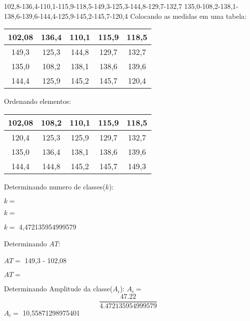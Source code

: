 \documentclass[12pt]{article}%
\begin{document}
 102,8-136,4-110,1-115,9-118,5-149,3-125,3-144,8-129,7-132,7
 135,0-108,2-138,1-138,6-139,6-144,4-125,9-145,2-145,7-120,4
 \break Colocando as medidas em uma tabela:
\begin{center}
    \begin{tabular}{|c|c|c|c|c|}
    \hline
        102,08 & 136,4 & 110,1 & 115,9 & 118,5 \\\hline
        149,3 & 125,3 & 144,8 & 129,7 & 132,7 \\\hline
        135,0 & 108,2 & 138,1 & 138,6 & 139,6 \\\hline
        144,4 & 125,9 & 145,2 & 145,7 & 120,4 \\\hline 
    \end{tabular}
\end{center}
Ordenando elementos:
\begin{center}
    \begin{tabular}{|c|c|c|c|c|}
    \hline
        102,08 & 108,2 & 110,1 & 115,9 & 118,5 \\\hline
        120,4 & 125,3 & 125,9 & 129,7 & 132,7 \\\hline
        135,0 & 136,4 & 138,1 & 138,6 & 139,6 \\\hline
        144,4 & 144,8 & 145,2 & 145,7 & 149,3 \\\hline 
    \end{tabular}
\end{center}
 Determinando numero de classes($k$):
 
 $k=$ 
 
 $k=$ 

 $k=$ 4,472135954999579


Determinando $AT$:
 
$AT=$ 149,3 - 102,08

$AT=$ \pgfmathresult

Determinando Amplitude da classe($A_{i}$):
$A_{i}=$ \[\frac{47.22}{4.472135954999579}\]
\newcommand{\AC}{10.55871298975401}
$A_{i}=$ 10,55871298975401
\end{document}
